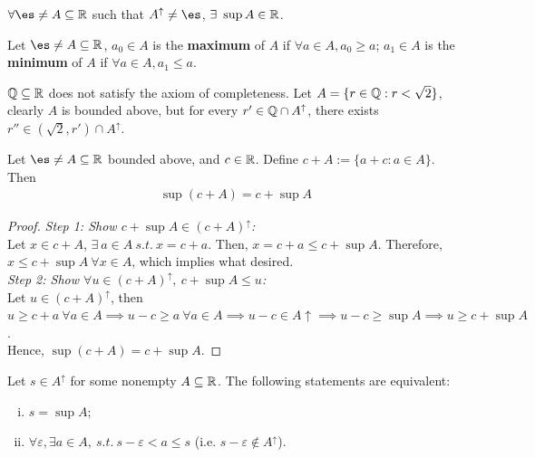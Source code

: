 \documentclass[11pt]{article}
\begin{document}
	\begin{axiom}
		$\forall \es \neq A \subseteq \R$ such that $A^\uparrow \neq \es$, $\exists\ \sup A \in \mathbb{R}$.
	\end{axiom}
	
	\begin{definition}
		Let $\es \neq A \subseteq \R$, $a_0 \in A$ is the \textbf{maximum} of $A$ if $\forall a \in A, a_0 \geq a $; $a_1 \in A$ is the \textbf{minimum} of $A$ if 
		$\forall a \in A, a_1 \leq a$.
	\end{definition}
	
	\begin{example}
		$\mathbb{Q} \subseteq \mathbb{R}$ does not satisfy the axiom of completeness. Let $A = \{r \in \mathbb{Q}: r < \sqrt{2}\}$, clearly $A$ is bounded above, but for every $r' \in \mathbb{Q} \cap A^\uparrow$, there exists $r'' \in (\sqrt{2}, r') \cap A^\uparrow$.
	\end{example}
	
	\begin{proposition}
		Let $\es \neq A \subseteq \R$ bounded above, and $c \in \mathbb{R}$. Define $c + A := \{a + c: a \in A\}$. Then
		\begin{align}
			\sup (c + A) = c + \sup A
		\end{align}
	\end{proposition}
	
	\begin{proof}
		\emph{Step 1: Show $c + \sup A \in (c + A)^\uparrow$:} \\
		Let $x \in c + A$, $\exists\ a \in A\ s.t.\ x = c + a$. Then, $x = c + a \leq c + \sup A$. Therefore, $x \leq c + \sup A\ \forall x \in A$, which implies what desired. \\
		\emph{Step 2: Show $\forall u \in (c + A)^\uparrow,\ c + \sup A \leq u$: }\\
		Let $u \in (c + A)^\uparrow$, then $u \geq c + a\ \forall a \in A \implies u - c \geq a\ \forall a \in A \implies u - c \in A\uparrow \implies u - c \geq \sup A \implies u \geq c + \sup A$. \\
		Hence, $\sup (c + A) = c + \sup A$.
	\end{proof}
	
	\begin{lemma}
		Let $s \in A^\uparrow$ for some nonempty $A \subseteq \mathbb{R}$. The following statements are equivalent:
		\begin{enumerate}[(i)]
			\item $s = \sup A$;
			\item $\forall \varepsilon, \exists a \in A,\ s.t.\ s - \varepsilon < a \leq s$ (i.e. $s - \varepsilon \notin A^\uparrow$).
		\end{enumerate}
	\end{lemma}
	
\end{document}
